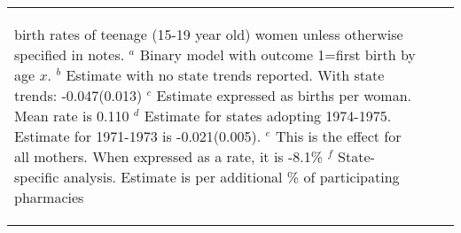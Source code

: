 \begin{table}[htpb!]
\begin{tabular}{lcl}
{\begin{footnotesize}
birth rates of teenage (15-19 year old) women unless otherwise specified 
in notes. \newline 
$^a$ Binary model with outcome 1=first birth by age $x$. \newline
$^b$ Estimate with no state trends reported.  With state trends: -0.047(0.013) \newline 
$^c$ Estimate expressed as births per woman.  Mean rate is 0.110 \newline 
$^d$ Estimate for states adopting 1974-1975. Estimate for 1971-1973 is 
-0.021(0.005). \newline
$^e$ This is the effect for all mothers.  When expressed as a rate, it is -8.1\% \newline
$^f$ State-specific analysis. Estimate is per additional \% of 
participating pharmacies
\end{footnotesize}} 
\end{tabular}
\end{table}


